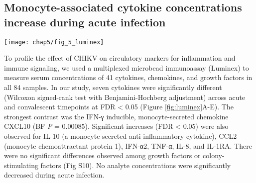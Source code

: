 \subsection{Monocyte-associated cytokine concentrations increase during acute infection}

\begin{figure*}[htb]
  \centering
  \texttt{[image: chap5/fig\_5\_luminex]}
  \caption[Differences in serum cytokine and chemokine levels between the acute and convalescent phase samples]{
  \textbf{Differences in serum cytokine and chemokine levels between the acute and convalescent phase samples.} Wilcoxon signed-rank test was used to determine statistical significance, with a Benjamini-Hochberg adjustment for FDR (n = 41). *\emph{P} < 0.05, ***\emph{P} < 0.001. A, CXC chemokines. B, CC chemokines. C, interferons. D, TNF superfamily cytokines. E, interleukins. Note that IL-8 is both a CXC chemokine (CXCL8) and an interleukin, so it is depicted twice. Growth factors and colony-stimulating factors are shown in Fig S10.
  }
  \label{fig:luminex}
\end{figure*}

To profile the effect of CHIKV on circulatory markers for inflammation and immune signaling, we used a multiplexed microbead immunoassay (Luminex) to measure serum concentrations of 41 cytokines, chemokines, and growth factors in all 84 samples. In our study, seven cytokines were significantly different (Wilcoxon signed-rank test with Benjamini-Hochberg adjustment) across acute and convalescent timepoints at FDR < 0.05 (Figure \ref{fig:luminex}A-E). The strongest contrast was the IFN-γ inducible, monocyte-secreted chemokine CXCL10 (BF \emph{P} = 0.00085). Significant increases (FDR < 0.05) were also observed for IL-10 (a monocyte-secreted anti-inflammatory cytokine), CCL2 (monocyte chemoattractant protein 1), IFN-α2, TNF-α, IL-8, and IL-1RA. There were no significant differences observed among growth factors or colony-stimulating factors (Fig S10). No analyte concentrations were significantly decreased during acute infection.

